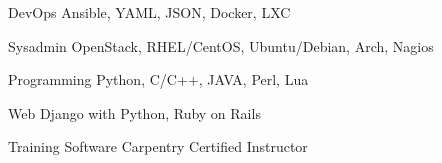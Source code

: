 

\begin{cvskills}

  \cvskill
    {DevOps} %
    {Ansible, YAML, JSON, Docker, LXC}

  \cvskill
    {Sysadmin} %
    {OpenStack, RHEL/CentOS, Ubuntu/Debian, Arch, Nagios} %

  \cvskill
    {Programming} %
    {Python, C/C++, JAVA, Perl, Lua} %

  \cvskill
    {Web} %
    {Django with Python, Ruby on Rails} %

  \cvskill
    {Training} %
    {Software Carpentry Certified Instructor} %

\end{cvskills}
